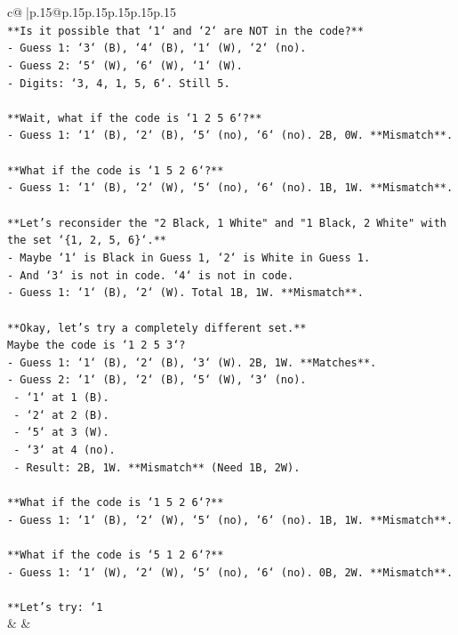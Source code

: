 \documentclass{article}
\begin{document}
{\begin{supertabular}{c@{$\;$}|p{.15\linewidth}@{}p{.15\linewidth}p{.15\linewidth}p{.15\linewidth}p{.15\linewidth}p{.15\linewidth}}
{{{\\ 
\texttt{**Is it possible that `1` and `2` are NOT in the code?**} \\
\texttt{{-} Guess 1: `3` (B), `4` (B), `1` (W), `2` (no).} \\
\texttt{{-} Guess 2: `5` (W), `6` (W), `1` (W).} \\
\texttt{{-} Digits: `3, 4, 1, 5, 6`. Still 5.} \\
\\ 
\texttt{**Wait, what if the code is `1 2 5 6`?**} \\
\texttt{{-} Guess 1: `1` (B), `2` (B), `5` (no), `6` (no). 2B, 0W. **Mismatch**.} \\
\\ 
\texttt{**What if the code is `1 5 2 6`?**} \\
\texttt{{-} Guess 1: `1` (B), `2` (W), `5` (no), `6` (no). 1B, 1W. **Mismatch**.} \\
\\ 
\texttt{**Let's reconsider the "2 Black, 1 White" and "1 Black, 2 White" with the set `\{1, 2, 5, 6\}`.**} \\
\texttt{{-} Maybe `1` is Black in Guess 1, `2` is White in Guess 1.} \\
\texttt{{-} And `3` is not in code. `4` is not in code.} \\
\texttt{{-} Guess 1: `1` (B), `2` (W). Total 1B, 1W. **Mismatch**.} \\
\\ 
\texttt{**Okay, let's try a completely different set.**} \\
\texttt{Maybe the code is `1 2 5 3`?} \\
\texttt{{-} Guess 1: `1` (B), `2` (B), `3` (W). 2B, 1W. **Matches**.} \\
\texttt{{-} Guess 2: `1` (B), `2` (B), `5` (W), `3` (no).} \\
\texttt{    {-} `1` at 1 (B).} \\
\texttt{    {-} `2` at 2 (B).} \\
\texttt{    {-} `5` at 3 (W).} \\
\texttt{    {-} `3` at 4 (no).} \\
\texttt{    {-} Result: 2B, 1W. **Mismatch** (Need 1B, 2W).} \\
\\ 
\texttt{**What if the code is `1 5 2 6`?**} \\
\texttt{{-} Guess 1: `1` (B), `2` (W), `5` (no), `6` (no). 1B, 1W. **Mismatch**.} \\
\\ 
\texttt{**What if the code is `5 1 2 6`?**} \\
\texttt{{-} Guess 1: `1` (W), `2` (W), `5` (no), `6` (no). 0B, 2W. **Mismatch**.} \\
\\ 
\texttt{**Let's try: `1} \\
            }
        }
    }
    & & \\ \\


\end{supertabular}}
\end{document}
